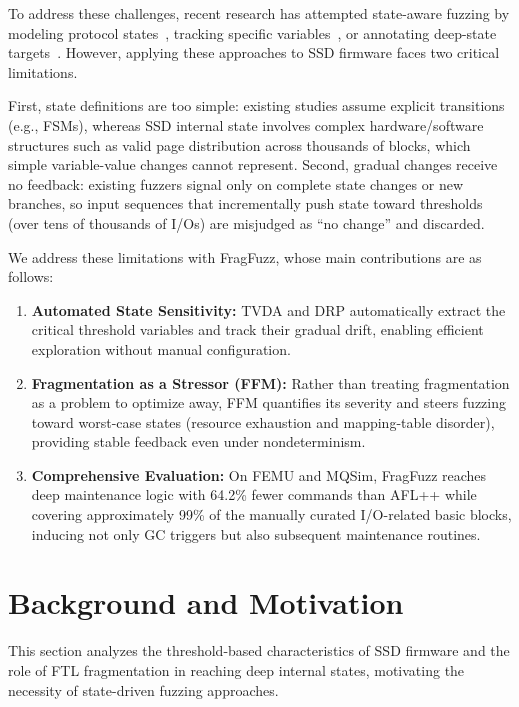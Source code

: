\documentclass[conference]{IEEEtran}
\begin{document}
To address these challenges, recent research has attempted state-aware fuzzing by modeling protocol states~\cite{aflnet, stateafl}, tracking specific variables~\cite{statefuzz}, or annotating deep-state targets~\cite{ijon}.
However, applying these approaches to SSD firmware faces two critical limitations.

First, state definitions are too simple: existing studies assume explicit transitions (e.g., FSMs), whereas SSD internal state involves complex hardware/software structures such as valid page distribution across thousands of blocks, which simple variable-value changes cannot represent.
Second, gradual changes receive no feedback: existing fuzzers signal only on complete state changes or new branches, so input sequences that incrementally push state toward thresholds (over tens of thousands of I/Os) are misjudged as ``no change'' and discarded.

We address these limitations with FragFuzz, whose main contributions are as follows:
\begin{enumerate}
    \item \textbf{Automated State Sensitivity:} TVDA and DRP automatically extract the critical threshold variables and track their gradual drift, enabling efficient exploration without manual configuration.
    \item \textbf{Fragmentation as a Stressor (FFM):} Rather than treating fragmentation as a problem to optimize away, FFM quantifies its severity and steers fuzzing toward worst-case states (resource exhaustion and mapping-table disorder), providing stable feedback even under nondeterminism.
    \item \textbf{Comprehensive Evaluation:} On FEMU and MQSim, FragFuzz reaches deep maintenance logic with 64.2\% fewer commands than AFL++ while covering approximately 99\% of the manually curated I/O-related basic blocks, inducing not only GC triggers but also subsequent maintenance routines.
\end{enumerate}

\section{Background and Motivation}
This section analyzes the threshold-based characteristics of SSD firmware and the role of FTL fragmentation in reaching deep internal states, motivating the necessity of state-driven fuzzing approaches.
\end{document}
